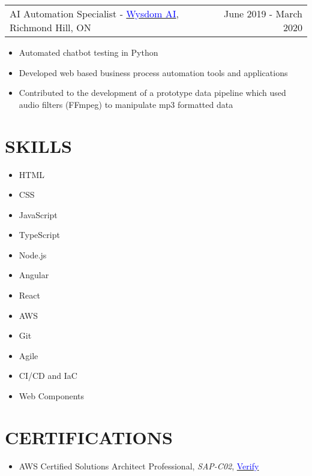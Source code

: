 \documentclass[margin]{res}
\begin{document}
\begin{resume}
	\begin{tabular}{p{3in} r} %
		AI Automation Specialist - \href{https://wysdom.ai}{\textcolor{blue}{Wysdom AI}}, Richmond Hill, ON & June 2019 - March 2020
	\end{tabular}
	\begin{itemize} %
		\item Automated chatbot testing in Python
		\item Developed web based business process automation tools and applications
		\item Contributed to the development of a prototype data pipeline which used audio filters
		      (FFmpeg) to manipulate mp3 formatted data

	\end{itemize}
	\section{\textcolor{NavyBlue}{SKILLS}}
	\begin{multicols}{3}
		\begin{itemize}
			\item HTML
			\item CSS
			\item JavaScript
			\item TypeScript
			\item Node.js
			\item Angular
			\item React
			\item AWS
			\item Git
			\item Agile
			\item CI/CD and IaC
			\item Web Components
		\end{itemize}
	\end{multicols}

	\section{\textcolor{NavyBlue}{CERTIFICATIONS}}
	\begin{itemize} %
		\item AWS Certified Solutions Architect Professional, \textit{SAP-C02},
		      \href{https://www.youracclaim.com/badges/6768bef0-a7c0-42a6-9b36-6e13351250be}{\textcolor{blue}{Verify}}


\end{itemize}
\end{resume}
\end{document}
